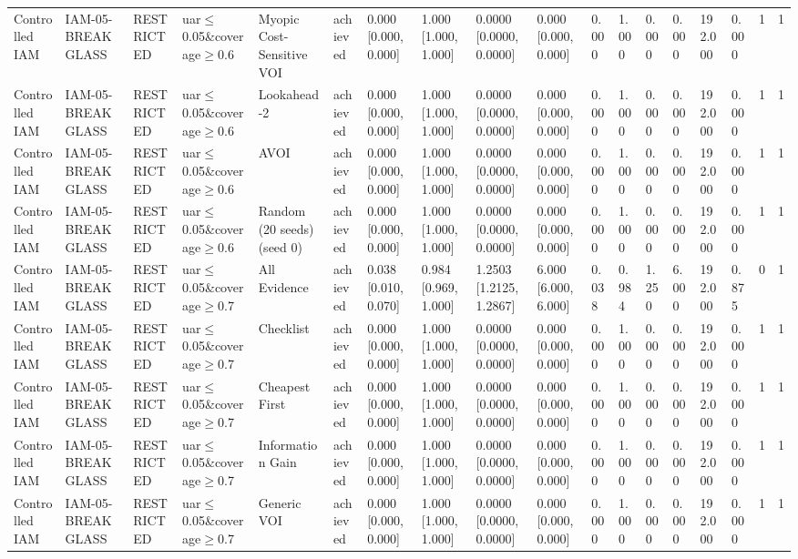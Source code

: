 \begin{table}[!ht]
{\begin{tabular}{llllllllllllllllll}
Controlled IAM & IAM-05-BREAKGLASS & RESTRICTED & uar$\le$0.05\&coverage$\ge$0.6 & Myopic Cost-Sensitive VOI & achieved & 0.000 [0.000, 0.000] & 1.000 [1.000, 1.000] & 0.0000 [0.0000, 0.0000] & 0.000 [0.000, 0.000] & 0.000 & 1.000 & 0.000 & 0.000 & 192.000 & 0.000 & 1 & 1 \\
Controlled IAM & IAM-05-BREAKGLASS & RESTRICTED & uar$\le$0.05\&coverage$\ge$0.6 & Lookahead-2 & achieved & 0.000 [0.000, 0.000] & 1.000 [1.000, 1.000] & 0.0000 [0.0000, 0.0000] & 0.000 [0.000, 0.000] & 0.000 & 1.000 & 0.000 & 0.000 & 192.000 & 0.000 & 1 & 1 \\
Controlled IAM & IAM-05-BREAKGLASS & RESTRICTED & uar$\le$0.05\&coverage$\ge$0.6 & AVOI & achieved & 0.000 [0.000, 0.000] & 1.000 [1.000, 1.000] & 0.0000 [0.0000, 0.0000] & 0.000 [0.000, 0.000] & 0.000 & 1.000 & 0.000 & 0.000 & 192.000 & 0.000 & 1 & 1 \\
Controlled IAM & IAM-05-BREAKGLASS & RESTRICTED & uar$\le$0.05\&coverage$\ge$0.6 & Random (20 seeds) (seed 0) & achieved & 0.000 [0.000, 0.000] & 1.000 [1.000, 1.000] & 0.0000 [0.0000, 0.0000] & 0.000 [0.000, 0.000] & 0.000 & 1.000 & 0.000 & 0.000 & 192.000 & 0.000 & 1 & 1 \\
Controlled IAM & IAM-05-BREAKGLASS & RESTRICTED & uar$\le$0.05\&coverage$\ge$0.7 & All Evidence & achieved & 0.038 [0.010, 0.070] & 0.984 [0.969, 1.000] & 1.2503 [1.2125, 1.2867] & 6.000 [6.000, 6.000] & 0.038 & 0.984 & 1.250 & 6.000 & 192.000 & 0.875 & 0 & 1 \\
Controlled IAM & IAM-05-BREAKGLASS & RESTRICTED & uar$\le$0.05\&coverage$\ge$0.7 & Checklist & achieved & 0.000 [0.000, 0.000] & 1.000 [1.000, 1.000] & 0.0000 [0.0000, 0.0000] & 0.000 [0.000, 0.000] & 0.000 & 1.000 & 0.000 & 0.000 & 192.000 & 0.000 & 1 & 1 \\
Controlled IAM & IAM-05-BREAKGLASS & RESTRICTED & uar$\le$0.05\&coverage$\ge$0.7 & Cheapest First & achieved & 0.000 [0.000, 0.000] & 1.000 [1.000, 1.000] & 0.0000 [0.0000, 0.0000] & 0.000 [0.000, 0.000] & 0.000 & 1.000 & 0.000 & 0.000 & 192.000 & 0.000 & 1 & 1 \\
Controlled IAM & IAM-05-BREAKGLASS & RESTRICTED & uar$\le$0.05\&coverage$\ge$0.7 & Information Gain & achieved & 0.000 [0.000, 0.000] & 1.000 [1.000, 1.000] & 0.0000 [0.0000, 0.0000] & 0.000 [0.000, 0.000] & 0.000 & 1.000 & 0.000 & 0.000 & 192.000 & 0.000 & 1 & 1 \\
Controlled IAM & IAM-05-BREAKGLASS & RESTRICTED & uar$\le$0.05\&coverage$\ge$0.7 & Generic VOI & achieved & 0.000 [0.000, 0.000] & 1.000 [1.000, 1.000] & 0.0000 [0.0000, 0.0000] & 0.000 [0.000, 0.000] & 0.000 & 1.000 & 0.000 & 0.000 & 192.000 & 0.000 & 1 & 1 \\

\end{tabular}}
\end{table}
